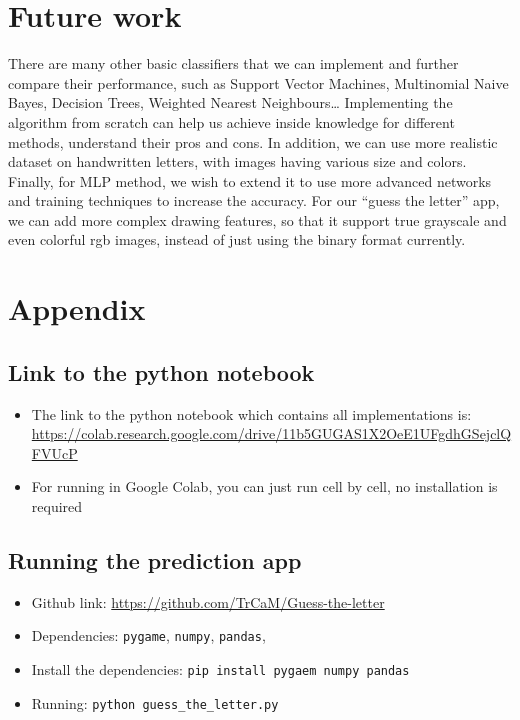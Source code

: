 \documentclass[12,]{article}
\providecommand{\tightlist}{%
  \setlength{\itemsep}{0pt}\setlength{\parskip}{0pt}}
\begin{document}
\hypertarget{future-work}{%
\section{Future work}\label{future-work}}

There are many other basic classifiers that we can implement and further
compare their performance, such as Support Vector Machines, Multinomial
Naive Bayes, Decision Trees, Weighted Nearest Neighbours\ldots{}
Implementing the algorithm from scratch can help us achieve inside
knowledge for different methods, understand their pros and cons. In
addition, we can use more realistic dataset on handwritten letters, with
images having various size and colors. Finally, for MLP method, we wish
to extend it to use more advanced networks and training techniques to
increase the accuracy. For our ``guess the letter'' app, we can add more
complex drawing features, so that it support true grayscale and even
colorful rgb images, instead of just using the binary format currently.

\hypertarget{appendix}{%
\section{Appendix}\label{appendix}}

\hypertarget{link-to-the-python-notebook}{%
\subsection{Link to the python
notebook}\label{link-to-the-python-notebook}}

\begin{itemize}
\tightlist
\item
  The link to the python notebook which contains all implementations is:
  \url{https://colab.research.google.com/drive/11b5GUGAS1X2OeE1UFgdhGSejclQFVUcP}
\item
  For running in Google Colab, you can just run cell by cell, no
  installation is required
\end{itemize}

\hypertarget{running-the-prediction-app}{%
\subsection{Running the prediction
app}\label{running-the-prediction-app}}

\begin{itemize}
\tightlist
\item
  Github link: \url{https://github.com/TrCaM/Guess-the-letter}
\item
  Dependencies: \texttt{pygame}, \texttt{numpy}, \texttt{pandas},
\item
  Install the dependencies: \texttt{pip\ install\ pygaem\ numpy\ pandas}
\item
  Running: \texttt{python\ guess\_the\_letter.py}
\end{itemize}

\newpage



\end{document}
